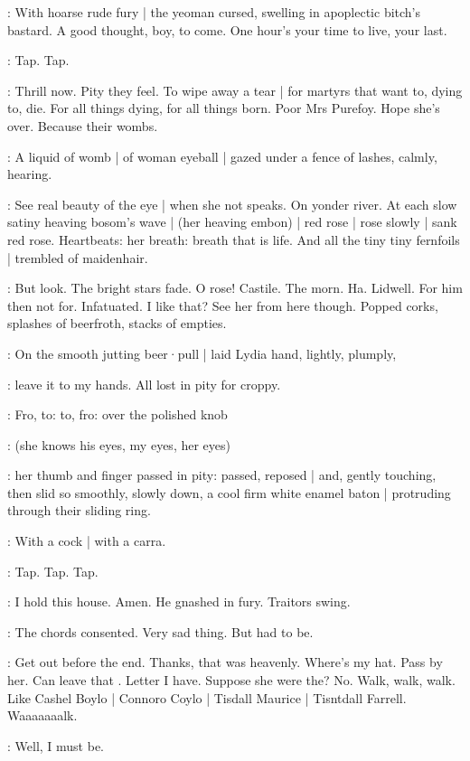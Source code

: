 :
With hoarse rude fury |
the yeoman cursed,
swelling in apoplectic bitch's bastard.
A good thought,
boy,
to come.
One hour's your time to live,
your last.

\stripling:
Tap.
Tap.

\BloomInt:
Thrill now.
Pity they feel.
To wipe away a tear |
for martyrs that want to,
dying to,
die.
For all things dying,
for all things born.
Poor Mrs Purefoy.
Hope she's over.
Because their wombs.

:
A liquid of womb |
of woman eyeball |
gazed under a fence of lashes,
calmly,
hearing.

\BloomInt:
See real beauty of the eye |
when she not speaks.
On yonder river.
At each slow satiny heaving bosom's wave |
(her heaving embon) |
red rose |
rose slowly |
sank red rose.
Heartbeats:
her breath:
breath that is life.
And all the tiny tiny fernfoils |
trembled of maidenhair.

\BloomInt:
But look.
The bright stars fade.
O rose!
Castile.
The morn.
Ha.
Lidwell.
For him then not for.
Infatuated.
I like that?
See her from here though.
Popped corks,
splashes of beerfroth,
stacks of empties.

:
On the smooth jutting beer·pull |
laid Lydia hand,
lightly,
plumply,

\BloomInt:
leave it to my hands.
All lost in pity for croppy.

:
Fro,
to:
to,
fro:
over the polished knob

\BloomInt:
(she knows his eyes,
my eyes,
her eyes)

:
her thumb and finger passed in pity:
passed,
reposed |
and, gently touching,
then slid so smoothly,
slowly down,
a cool firm white enamel baton |
protruding through their sliding ring.

\BloomInt:
With a cock |
with a carra.

\stripling:
Tap.
Tap.
Tap.

:
I hold this house.
Amen.
He gnashed in fury.
Traitors swing.

:
The chords consented.
Very sad thing.
But had to be.

\BloomInt:
Get out before the end.
Thanks,
that was heavenly.
Where's my hat.
Pass by her.
Can leave that .
Letter I have.
Suppose she were the?
No.
Walk,
walk,
walk.
Like Cashel Boylo |
Connoro Coylo |
Tisdall Maurice |
Tisntdall Farrell.
Waaaaaaalk.

\Bloom:
Well,
I must be.

